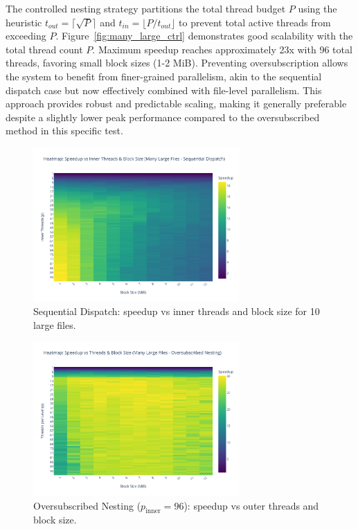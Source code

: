 \documentclass[10pt]{article}
\begin{document}
The controlled nesting strategy partitions the total thread budget $P$ using the heuristic $t_{out} = \lceil \sqrt{P} \rceil$ and $t_{in} = \lfloor P / t_{out} \rfloor$ to prevent total active threads from exceeding $P$. Figure~\ref{fig:many_large_ctrl} demonstrates good scalability with the total thread count $P$. Maximum speedup reaches approximately 23x with 96 total threads, favoring small block sizes (1-2 MiB). Preventing oversubscription allows the system to benefit from finer-grained parallelism, akin to the sequential dispatch case but now effectively combined with file-level parallelism. This approach provides robust and predictable scaling, making it generally preferable despite a slightly lower peak performance compared to the oversubscribed method in this specific test.

\begin{figure}[H]
    \centering
    \includegraphics[width=0.7\textwidth]{../results/plots/many_large_sequential/speedup_matrix_many_large_sequential.pdf}
    \caption{Sequential Dispatch: speedup vs inner threads and block size for 10 large files.}
    \label{fig:many_large_seq}
\end{figure}

\begin{figure}[H]
    \centering
    \includegraphics[width=0.7\textwidth]{../results/plots/many_large_parallel/speedup_matrix_many_large_parallel.pdf}
    \caption{Oversubscribed Nesting ($p_{\text{inner}}=96$): speedup vs outer threads and block size.}
    \label{fig:many_large_over}
\end{figure}
\end{document}
